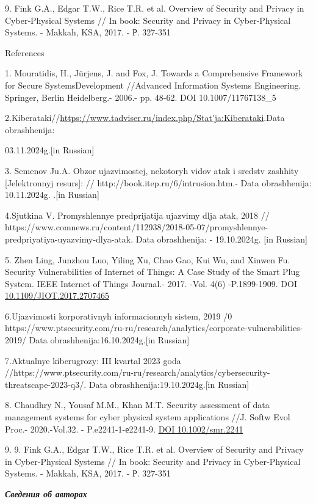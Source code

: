 \documentclass[
]{article}
\begin{document}
9. Fink G.A., Edgar T.W., Rice T.R. et al. Overview of Security and
Privacy in Cyber‐Physical Systems // In book: Security and Privacy in
Cyber‐Physical Systems. - Makkah, KSA, 2017. - Р. 327-351

References

1. Mouratidis, H., Jürjens, J. and Fox, J. Towards a Comprehensive
Framework for Secure SystemsDevelopment //Advanced Information Systems
Engineering. Springer, Berlin Heidelberg.- 2006.- pp. 48-62. DOI
10.1007/11767138\_5

2.Kiberataki//\url{https://www.tadviser.ru/index.php/Stat'ja:Kiberataki}.Data
obrashhenija:

03.11.2024g.{[}in Russian{]}

3. Semenov Ju.A. Obzor ujazvimostej, nekotoryh vidov atak i sredstv
zashhity {[}Jelektronnyj resurs{]}: //
http://book.itep.ru/6/intrusion.htm.- Data obrashhenija: 10.11.2024g.
.{[}in Russian{]}

4.Sjutkina V. Promyshlennye predprijatija ujazvimy dlja atak, 2018 //
https://www.comnews.ru/content/112938/2018-05-07/promyshlennye-predpriyatiya-uyazvimy-dlya-atak.
Data obrashhenija: - 19.10.2024g. {[}in Russian{]}

5. Zhen Ling, Junzhou Luo, Yiling Xu, Chao Gao, Kui Wu, and Xinwen Fu.
Security Vulnerabilities of Internet of Things: A Case Study of the
Smart Plug System. IEEE Internet of Things Journal.- 2017. -Vol. 4(6)
-P.1899-1909. DOI
\href{https://doi.org/10.1109/JIOT.2017.2707465}{10.1109/JIOT.2017.2707465}

6.Ujazvimosti korporativnyh informacionnyh sistem, 2019 /0
https://www.ptsecurity.com/ru-ru/research/analytics/corporate-vulnerabilities-2019/
Data obrashhenija:16.10.2024g.{[}in Russian{]}

7.Aktual\textquotesingle nye kiberugrozy: III kvartal 2023 goda
//https://www.ptsecurity.com/ru-ru/research/analytics/cybersecurity-threatscape-2023-q3/.
Data obrashhenija:19.10.2024g.{[}in Russian{]}

8. Chaudhry N., Yousaf M.M., Khan M.T. Security assessment of data
management systems for cyber physical system applications //J. Softw
Evol Proc.- 2020.-Vol.32. - P.e2241-1-е2241-9.
\href{https://doi.org/10.1002/smr.2241}{DOI 10.1002/smr.2241}

9. 9. Fink G.A., Edgar T.W., Rice T.R. et al. Overview of Security and
Privacy in Cyber‐Physical Systems // In book: Security and Privacy in
Cyber‐Physical Systems. - Makkah, KSA, 2017. - Р. 327-351

\emph{\textbf{Сведения об авторах}}
\end{document}
